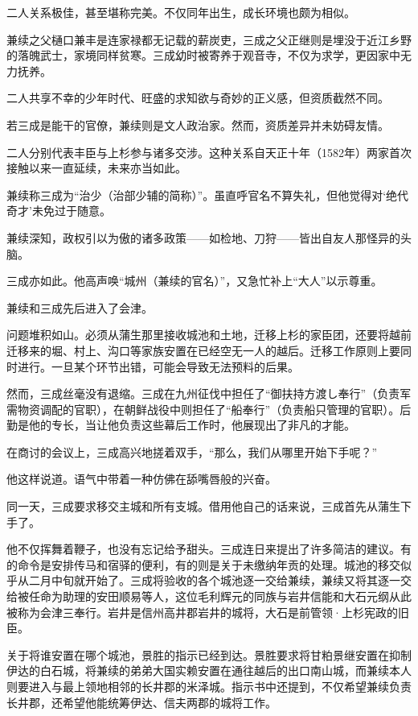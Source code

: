\documentclass[
]{article}
\begin{document}
二人关系极佳，甚至堪称完美。不仅同年出生，成长环境也颇为相似。

兼续之父樋口兼丰是连家禄都无记载的薪炭吏，三成之父正继则是埋没于近江乡野的落魄武士，家境同样贫寒。三成幼时被寄养于观音寺，不仅为求学，更因家中无力抚养。

二人共享不幸的少年时代、旺盛的求知欲与奇妙的正义感，但资质截然不同。

若三成是能干的官僚，兼续则是文人政治家。然而，资质差异并未妨碍友情。

二人分别代表丰臣与上杉参与诸多交涉。这种关系自天正十年（1582年）两家首次接触以来一直延续，未来亦当如此。

兼续称三成为``治少（治部少辅的简称）''。虽直呼官名不算失礼，但他觉得对`绝代奇才'未免过于随意。

兼续深知，政权引以为傲的诸多政策------如检地、刀狩------皆出自友人那怪异的头脑。

三成亦如此。他高声唤``城州（兼续的官名）''，又急忙补上``大人''以示尊重。

兼续和三成先后进入了会津。

问题堆积如山。必须从蒲生那里接收城池和土地，迁移上杉的家臣团，还要将越前迁移来的堀、村上、沟口等家族安置在已经空无一人的越后。迁移工作原则上要同时进行。一旦某个环节出错，可能会导致无法预料的后果。

然而，三成丝毫没有退缩。三成在九州征伐中担任了``御扶持方渡し奉行''（负责军需物资调配的官职），在朝鲜战役中则担任了``船奉行''（负责船只管理的官职）。后勤是他的专长，当让他负责这些幕后工作时，他展现出了非凡的才能。

在商讨的会议上，三成高兴地搓着双手，``那么，我们从哪里开始下手呢？''

他这样说道。语气中带着一种仿佛在舔嘴唇般的兴奋。

同一天，三成要求移交主城和所有支城。借用他自己的话来说，三成首先从蒲生下手了。

他不仅挥舞着鞭子，也没有忘记给予甜头。三成连日来提出了许多简洁的建议。有的命令是安排传马和宿驿的便利，有的则是关于未缴纳年贡的处理。城池的移交似乎从二月中旬就开始了。三成将验收的各个城池逐一交给兼续，兼续又将其逐一交给被任命为助理的安田顺易等人，这位毛利辉元的同族与岩井信能和大石元纲从此被称为会津三奉行。岩井是信州高井郡岩井的城将，大石是前管领·上杉宪政的旧臣。

关于将谁安置在哪个城池，景胜的指示已经到达。景胜要求将甘粕景继安置在抑制伊达的白石城，将兼续的弟弟大国实赖安置在通往越后的出口南山城，而兼续本人则要进入与最上领地相邻的长井郡的米泽城。指示书中还提到，不仅希望兼续负责长井郡，还希望他能统筹伊达、信夫两郡的城将工作。
\end{document}
